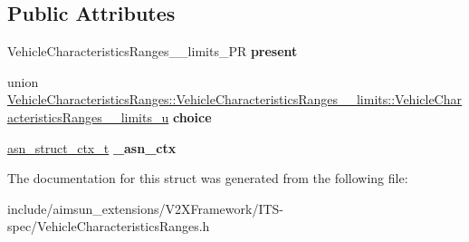 \subsection*{Public Attributes}
\begin{DoxyCompactItemize}
\item 
Vehicle\+Characteristics\+Ranges\+\_\+\+\_\+limits\+\_\+\+PR {\bfseries present}\hypertarget{structVehicleCharacteristicsRanges_1_1VehicleCharacteristicsRanges____limits_a3619b40a9e379443f42a83455b1cbc8f}{}\label{structVehicleCharacteristicsRanges_1_1VehicleCharacteristicsRanges____limits_a3619b40a9e379443f42a83455b1cbc8f}

\item 
union \hyperlink{unionVehicleCharacteristicsRanges_1_1VehicleCharacteristicsRanges____limits_1_1VehicleCharacteristicsRanges____limits__u}{Vehicle\+Characteristics\+Ranges\+::\+Vehicle\+Characteristics\+Ranges\+\_\+\+\_\+limits\+::\+Vehicle\+Characteristics\+Ranges\+\_\+\+\_\+limits\+\_\+u} {\bfseries choice}\hypertarget{structVehicleCharacteristicsRanges_1_1VehicleCharacteristicsRanges____limits_a81f9a1c134554c688723728e05b0708c}{}\label{structVehicleCharacteristicsRanges_1_1VehicleCharacteristicsRanges____limits_a81f9a1c134554c688723728e05b0708c}

\item 
\hyperlink{structasn__struct__ctx__s}{asn\+\_\+struct\+\_\+ctx\+\_\+t} {\bfseries \+\_\+asn\+\_\+ctx}\hypertarget{structVehicleCharacteristicsRanges_1_1VehicleCharacteristicsRanges____limits_a3f855f227faf3b405e64e83c34f94e6f}{}\label{structVehicleCharacteristicsRanges_1_1VehicleCharacteristicsRanges____limits_a3f855f227faf3b405e64e83c34f94e6f}

\end{DoxyCompactItemize}


The documentation for this struct was generated from the following file\+:\begin{DoxyCompactItemize}
\item 
include/aimsun\+\_\+extensions/\+V2\+X\+Framework/\+I\+T\+S-\/spec/Vehicle\+Characteristics\+Ranges.\+h\end{DoxyCompactItemize}
